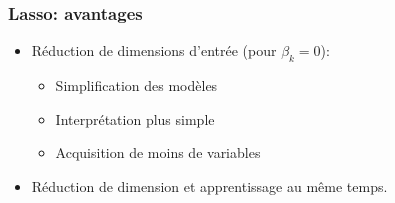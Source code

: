 

\begin{frame}
  \frametitle{Lasso: avantages}
  \begin{itemize}
  \item Réduction de dimensions d'entrée (pour $\beta_k=0$): 
  \begin{itemize}
    \item Simplification des modèles
    \item Interprétation plus simple
    \item Acquisition de moins de variables
  \end{itemize}
  \item Réduction de dimension et apprentissage au même temps. 
  \end{itemize}
\end{frame}

